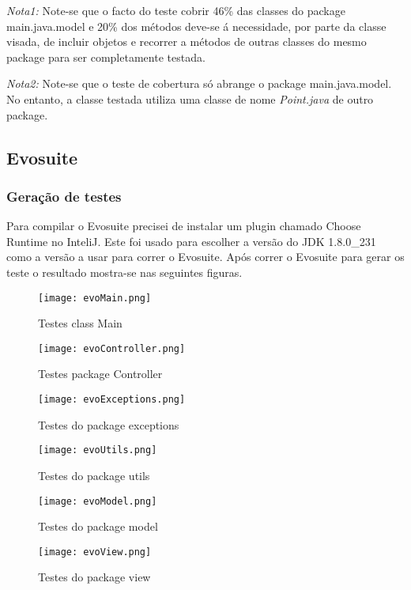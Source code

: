 \par \textit{Nota1:} Note-se que o facto do teste cobrir 46\% das classes do package main.java.model e 20\% dos métodos deve-se á necessidade, por parte da classe visada, de incluir objetos e recorrer a métodos de outras classes do mesmo package para ser completamente testada.\newline
\par \textit{Nota2:} Note-se que o teste de cobertura só abrange o package main.java.model. No entanto, a classe testada utiliza uma classe de nome \textit{Point.java} de outro package.

\subsection{Evosuite}

\subsubsection{Geração de testes}

\par Para compilar o Evosuite precisei de instalar um plugin chamado Choose Runtime no InteliJ. Este foi usado para escolher a versão do JDK 1.8.0\_231 como a versão a usar para correr o Evosuite. Após correr o Evosuite para gerar os teste o resultado mostra-se nas seguintes figuras.

\begin{figure}[H]

  \centering

  \texttt{[image: evoMain.png]}

  \caption {Testes class Main}

  \texttt{[image: evoController.png]}

  \caption {Testes package Controller}

  \texttt{[image: evoExceptions.png]}

  \caption {Testes do package exceptions}

  \texttt{[image: evoUtils.png]}

  \caption {Testes do package utils}
  \label {fig35}

\end{figure}  
\begin{figure}[H]

  \centering
  \texttt{[image: evoModel.png]}

  \caption {Testes do package model}

  \texttt{[image: evoView.png]}

  \caption {Testes do package view}

  \label {fig36}

\end{figure}

